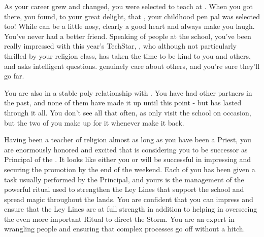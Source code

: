 \documentclass[char]{GL2020}
\begin{document}
As your career grew and changed, you were selected to teach at \pSchool{}. When you got there, you found, to your great delight, that \cMusic{}, your childhood pen pal was selected too! While \cMusic{} can be a little nosy, \cMusic{\they} clearly \cMusic{\have} a good heart and always make you laugh. You’ve never had a better friend.  Speaking of people at the school, you’ve been really impressed with this year’s TechStar, \cTechStar{}, who although not particularly thrilled by your religion class, has taken the time to be kind to you and others, and asks intelligent questions.  \cTechStar{\they} genuinely care about others, and you’re sure they’ll go far.

You are also in a stable poly relationship with \cJuniorStatesman{}. You have had other partners in the past, and none of them have made it up until this point - but \cJuniorStatesman{} has lasted through it all. You don’t see \cJuniorStatesman{\them} all that often, as \cJuniorStatesman{\they} only visit \cJuniorStatesman{\plural} the school on occasion, but the two of you make up for it whenever \cJuniorStatesman{\they} \cJuniorStatesman{\does} make it back.

Having been a teacher of religion almost as long as you have been a Priest, you are enormously honored and excited that \cPrincipal{} is considering you to be \cPrincipal{\their} successor as Principal of the \pSchool{}.  It looks like either you or \cMusic{} will be successful in impressing \cPrincipal{} and securing the promotion by the end of the weekend.  Each of you has been given a task usually performed by the Principal, and yours is the management of the powerful ritual used to strengthen the Ley Lines that support the school and spread magic throughout the lands.  You are confident that you can impress \cPrincipal{} and ensure that the Ley Lines are at full strength in addition to helping \cPrincipal{} in overseeing the even more important Ritual to direct the Storm. You are an expert in wrangling people and ensuring that complex processes go off without a hitch.
\end{document}
